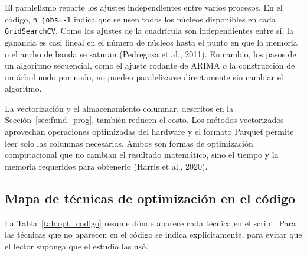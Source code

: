 El paralelismo reparte los ajustes independientes entre varios procesos. En el código, \texttt{n\_jobs=-1} indica que se usen todos los núcleos disponibles en cada \texttt{GridSearchCV}. Como los ajustes de la cuadrícula son independientes entre sí, la ganancia es casi lineal en el número de núcleos hasta el punto en que la memoria o el ancho de banda se saturan (Pedregosa et al., 2011). En cambio, los pasos de un algoritmo secuencial, como el ajuste rodante de ARIMA o la construcción de un árbol nodo por nodo, no pueden paralelizarse directamente sin cambiar el algoritmo.

La vectorización y el almacenamiento columnar, descritos en la Sección~\ref{sec:fund_prog}, también reducen el costo. Los métodos vectorizados aprovechan operaciones optimizadas del hardware y el formato Parquet permite leer solo las columnas necesarias. Ambos son formas de optimización computacional que no cambian el resultado matemático, sino el tiempo y la memoria requeridos para obtenerlo (Harris et al., 2020).

\subsection{Mapa de técnicas de optimización en el código}
La Tabla~\ref{tab:opt_codigo} resume dónde aparece cada técnica en el script. Para las técnicas que no aparecen en el código se indica explícitamente, para evitar que el lector suponga que el estudio las usó.

